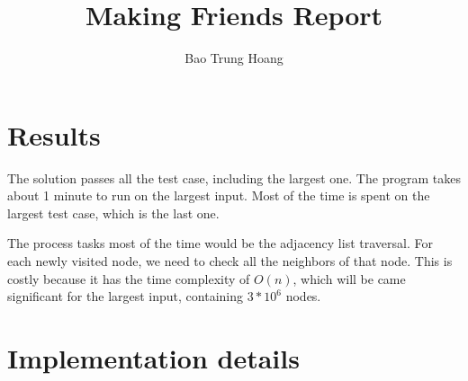 \documentclass{article}
\title{Making Friends Report}
\author{Bao Trung Hoang}
\begin{document}
  \maketitle

  \section{Results}


  The solution passes all the test case, including the largest one.
  The program takes about 1 minute to run on the largest input. 
  Most of the time is spent on the largest test case, which is the last one. 
  

  The process tasks most of the time would be the adjacency list traversal.
  For each newly visited node, we need to check all the neighbors of that node.
  This is costly because it has the time complexity of $O(n)$, which will be came 
  significant for the largest input, containing $3 * 10^6$ nodes.

  \section{Implementation details}

\end{document}
